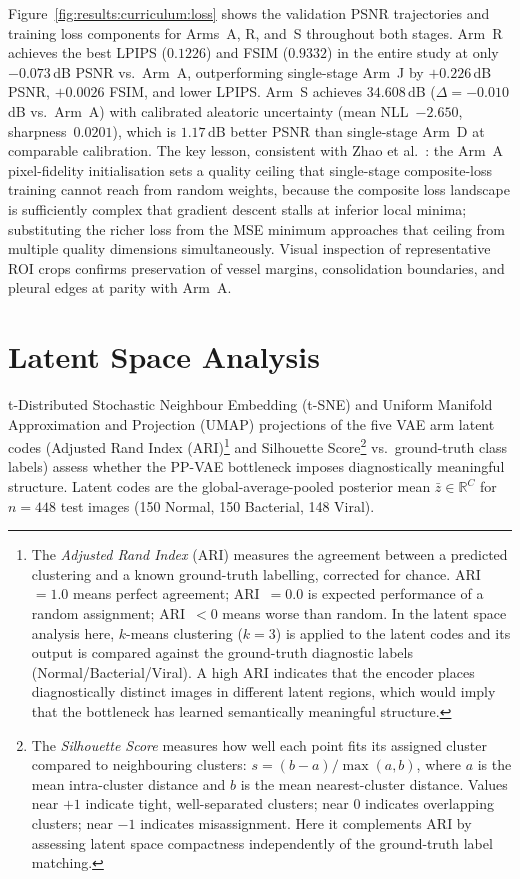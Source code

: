 \documentclass[12pt, a4paper, twoside, openright]{book}
\begin{document}
Figure~\ref{fig:results:curriculum:loss} shows the validation PSNR trajectories and training loss components for Arms~A, R, and~S throughout both stages. Arm~R achieves the best LPIPS ($0.1226$) and FSIM ($0.9332$) in the entire study at only $-0.073$\,dB PSNR vs.\ Arm~A, outperforming single-stage Arm~J by $+0.226$\,dB PSNR, $+0.0026$ FSIM, and lower LPIPS. Arm~S achieves $34.608$\,dB ($\Delta=-0.010$\,dB vs.\ Arm~A) with calibrated aleatoric uncertainty (mean NLL~$-2.650$, sharpness~$0.0201$), which is $1.17$\,dB better PSNR than single-stage Arm~D at comparable calibration. The key lesson, consistent with Zhao et al.\ \cite{zhao_loss_2017}: the Arm~A pixel-fidelity initialisation sets a quality ceiling that single-stage composite-loss training cannot reach from random weights, because the composite loss landscape is sufficiently complex that gradient descent stalls at inferior local minima; substituting the richer loss from the MSE minimum approaches that ceiling from multiple quality dimensions simultaneously. Visual inspection of representative ROI crops confirms preservation of vessel margins, consolidation boundaries, and pleural edges at parity with Arm~A.

\section{Latent Space Analysis}
\label{sec:results:latent}

t-Distributed Stochastic Neighbour Embedding (t-SNE) and Uniform Manifold Approximation and Projection (UMAP) projections of the five VAE arm latent codes (Adjusted Rand Index (ARI)\footnote{The \emph{Adjusted Rand Index} (ARI) measures the agreement between a predicted clustering and a known ground-truth labelling, corrected for chance. ARI~$=1.0$ means perfect agreement; ARI~$=0.0$ is expected performance of a random assignment; ARI~$<0$ means worse than random. In the latent space analysis here, $k$-means clustering ($k=3$) is applied to the latent codes and its output is compared against the ground-truth diagnostic labels (Normal/Bacterial/Viral). A high ARI indicates that the encoder places diagnostically distinct images in different latent regions, which would imply that the bottleneck has learned semantically meaningful structure.} and Silhouette Score\footnote{The \emph{Silhouette Score} measures how well each point fits its assigned cluster compared to neighbouring clusters: $s = (b-a)/\max(a,b)$, where $a$ is the mean intra-cluster distance and $b$ is the mean nearest-cluster distance. Values near $+1$ indicate tight, well-separated clusters; near $0$ indicates overlapping clusters; near $-1$ indicates misassignment. Here it complements ARI by assessing latent space compactness independently of the ground-truth label matching.} vs.\ ground-truth class labels) assess whether the PP-VAE bottleneck imposes diagnostically meaningful structure. Latent codes are the global-average-pooled posterior mean $\bar{z}\in\mathbb{R}^C$ for $n=448$ test images (150 Normal, 150 Bacterial, 148 Viral).
\end{document}
